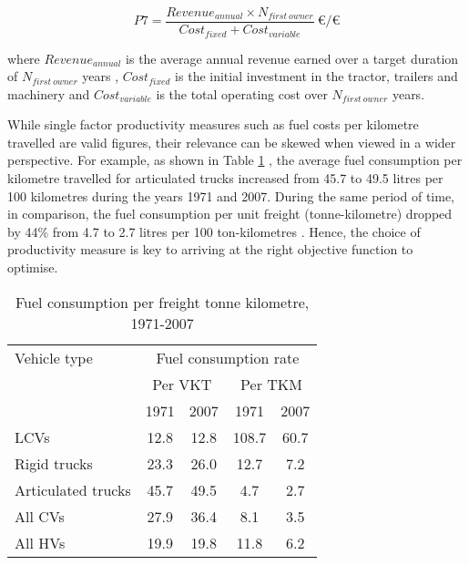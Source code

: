 \documentclass[ExampleMasters.tex]{subfiles}
\begin{document}
\begin{itemize}
			\begin{equation}
				P7 = \frac{Revenue_{annual} \times N_{first\ owner}}{Cost_{fixed} + Cost_{variable}}\ \euro/\euro
			\end{equation}

			where $Revenue_{annual}$  is the average annual revenue earned over a target duration of $N_{first\ owner}$ years , $Cost_{fixed}$  is the initial investment in the tractor, trailers and machinery and $Cost_{variable}$  is the total operating cost over $N_{first\ owner}$ years.

		\end{itemize}

		While single factor productivity measures such as fuel costs per kilometre travelled are valid figures, their relevance can be skewed when viewed in a wider perspective. For example, as shown in Table \ref{table:fuelConsumptionRate} \cite[T.~2.8]{TruckProdAus}, the average fuel consumption per kilometre travelled for articulated trucks increased from 45.7 to 49.5 litres per 100 kilometres during the years 1971 and 2007. During the same period of time, in comparison, the fuel consumption per unit freight (tonne-kilometre) dropped by 44\% from 4.7 to 2.7 litres per 100 ton-kilometres \cite{TruckProdAus}. Hence, the choice of productivity measure is key to arriving at the right objective function to optimise.\\

		\begin{table}[ht]
			\centering 
			\begin{tabular}{l c c c c}
  			\hline
			Vehicle type & \multicolumn{4}{c}{Fuel consumption rate}\\ \cline{2-3} \cline{4-5}
			\ & \multicolumn{2}{c}{Per VKT} & \multicolumn{2}{c}{Per TKM}\\ \cline{2-3} \cline{4-5}
			\ & 1971 & 2007 & 1971 & 2007\\ \hline
			    LCVs  & 12.8 & 12.8 & 108.7 & 60.7\\
			    Rigid trucks  & 23.3 & 26.0 & 12.7  & 7.2\\
			    Articulated trucks  & 45.7 & 49.5 & 4.7 & 2.7  \\
			    All CVs  & 27.9 & 36.4 & 8.1 & 3.5 \\
			    All HVs  & 19.9 & 19.8 & 11.8 & 6.2 \\
			\hline 
			\end{tabular}
			\caption{Fuel consumption per freight tonne kilometre, 1971-2007 \cite{TruckProdAus}} 
			\label{table:fuelConsumptionRate} 
		\end{table}
\end{document}
